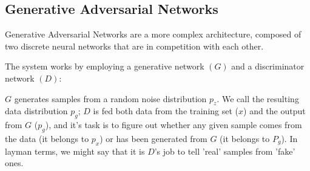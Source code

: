 

\subsection{Generative Adversarial Networks}
Generative Adversarial Networks are a more complex architecture, composed of two discrete neural networks that are in competition with each other.

The system works by employing a generative network $(G)$ and a discriminator network $(D)$:

$G$ generates samples from a random noise distribution $p_z$. We call the resulting data distribution $p_g$; $D$ is fed both data from the training set ($x$) and the output from $G$ ($p_g$), and it's task is to figure out whether any given sample comes from the data (it belongs to $p_x$) or has been generated from $G$ (it belongs to $P_g$). In layman terms, we might say that it is $D$'s job to tell 'real' samples from 'fake' ones.




